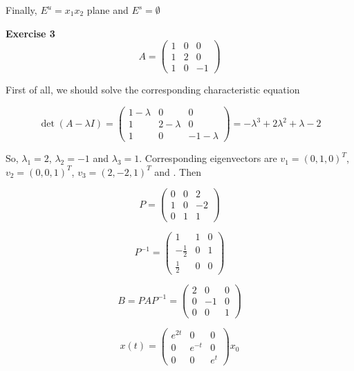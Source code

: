 \documentclass[12pt]{article}
\begin{document}
    Finally, $E^u=x_1 x_2$ plane and $E^s=\emptyset$


    \textbf{Exercise 3}
    $$
        A =
        \begin{pmatrix}
            1 & 0 & 0\\
            1 & 2 & 0\\
            1 & 0 & -1
        \end{pmatrix}
    $$

    First of all, we should solve the corresponding
    characteristic equation

    $$
        \det (A - \lambda I) = 
        \begin{pmatrix}
            1-\lambda & 0 & 0\\
            1 & 2-\lambda & 0\\
            1 & 0 & -1-\lambda
        \end{pmatrix} =
        -\lambda^3+2\lambda^2+\lambda-2
    $$

    So, $\lambda_1 = 2$, $\lambda_2 = -1$
    and $\lambda_3 = 1$. Corresponding eigenvectors are 
    $v_1 = (0,1,0)^T$, $v_2 = (0,0,1)^T$, $v_3 = (2,-2,1)^T$ and
     . Then

    $$
        P =
        \begin{pmatrix}
            0 & 0 &  2\\
            1 & 0 & -2\\
            0 & 1 &  1
        \end{pmatrix}
    $$

    $$
        P^{-1} =
        \begin{pmatrix}
            1 & 1 & 0\\
            -\frac{1}{2} & 0 & 1\\
            \frac{1}{2} & 0 & 0
        \end{pmatrix}
    $$
    
    $$
        B = PAP^{-1} =
        \begin{pmatrix}
            2 & 0 & 0\\
            0 & -1 & 0\\
            0 & 0 & 1
        \end{pmatrix}
    $$

    $$
        x(t) = 
        \begin{pmatrix}
            e^{2t} & 0 & 0\\
            0 & e^{-t} & 0\\
            0 & 0 & e^{t}
        \end{pmatrix}
        x_0
    $$
\end{document}
